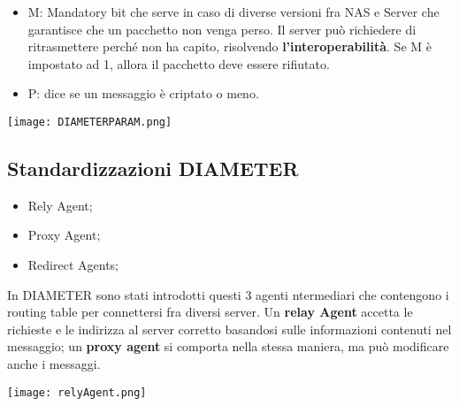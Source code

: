 \documentclass{article}
\theoremstyle{remark}
\begin{document}
\begin{itemize}
\begin{itemize}
\begin{itemize}
\begin{itemize}
				                  \item M: Mandatory bit che serve in caso di diverse versioni fra NAS e Server che garantisce che un pacchetto non venga perso. Il server può richiedere di ritrasmettere perché non ha capito, risolvendo \textbf{l'interoperabilità}. Se M è impostato ad 1, allora il pacchetto deve essere rifiutato.
				                  \item P: dice se un messaggio è criptato o meno.
			                  \end{itemize}
			                  \begin{center}
				                  \texttt{[image: DIAMETERPARAM.png]}
			                  \end{center}
		            \end{itemize}
	      \end{itemize}
\end{itemize}
\subsection{Standardizzazioni DIAMETER}
\begin{itemize}
	\item Rely Agent;
	\item Proxy Agent;
	\item Redirect Agents;
\end{itemize}
In DIAMETER sono stati introdotti questi 3 agenti ntermediari che contengono i routing table per connettersi fra diversi server.\newline
Un \textbf{relay Agent} accetta le richieste e le indirizza al server corretto basandosi sulle informazioni contenuti nel messaggio; un \textbf{proxy agent} si comporta nella stessa maniera, ma può modificare anche i messaggi.
\begin{center}
	\texttt{[image: relyAgent.png]}
\end{center}
\end{document}
